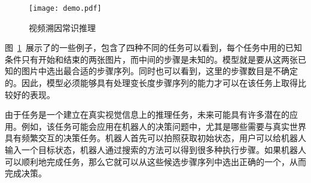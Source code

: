 \begin{figure}
    \texttt{[image: demo.pdf]}
    \caption{视频溯因常识推理}
    \label{fig:vacr}
\end{figure}
图~\ref{fig:vacr}~展示了\VACR 的一些例子，包含了四种不同的任务可以看到，每个任务中用的已知条件只有开始和结束的两张图片，而中间的步骤是未知的。模型就是要从这两张已知的图片中选出最合适的步骤序列。同时也可以看到，这里的步骤数目是不确定的。因此，模型必须能够具有处理变长度步骤序列的能力才可以在该任务上取得比较好的表现。

由于\VACR 任务是一个建立在真实视觉信息上的推理任务，未来可能具有许多潜在的应用。例如，该任务可能会应用在机器人的决策问题中，尤其是哪些需要与真实世界具有频繁交互的决策任务。机器人首先可以拍照获取初始状态，用户可以给机器人输入一个目标状态，机器人通过搜索的方法可以得到很多种执行步骤。如果机器人可以顺利地完成\VACR 任务，那么它就可以从这些候选步骤序列中选出正确的一个，从而完成决策。

